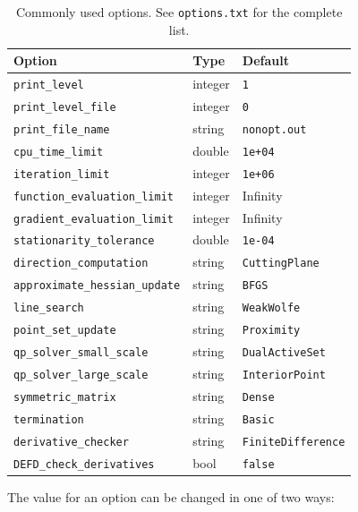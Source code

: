 \documentclass{article}
\begin{document}
\begin{table}[ht]
\centering
\begin{tabular}{|l|l|l|}
\hline
\textbf{Option} & \textbf{Type} & \textbf{Default} \\
\hline
\texttt{print\_level}                & integer & \texttt{1} \\
\texttt{print\_level\_file}          & integer & \texttt{0} \\
\texttt{print\_file\_name}           & string  & \texttt{nonopt.out} \\
\hline
\texttt{cpu\_time\_limit}            & double  & \texttt{1e+04} \\
\texttt{iteration\_limit}            & integer & \texttt{1e+06} \\
\texttt{function\_evaluation\_limit} & integer & Infinity \\
\texttt{gradient\_evaluation\_limit} & integer & Infinity \\
\texttt{stationarity\_tolerance}     & double  & \texttt{1e-04} \\
\hline
\texttt{direction\_computation}      & string  & \texttt{CuttingPlane} \\
\texttt{approximate\_hessian\_update}& string  & \texttt{BFGS} \\
\texttt{line\_search}                & string  & \texttt{WeakWolfe} \\
\texttt{point\_set\_update}          & string  & \texttt{Proximity} \\
\texttt{qp\_solver\_small\_scale}    & string  & \texttt{DualActiveSet} \\
\texttt{qp\_solver\_large\_scale}    & string  & \texttt{InteriorPoint} \\
\texttt{symmetric\_matrix}           & string  & \texttt{Dense} \\
\texttt{termination}                 & string  & \texttt{Basic} \\
\hline
\texttt{derivative\_checker}         & string  & \texttt{FiniteDifference} \\
\texttt{DEFD\_check\_derivatives}    & bool    & \texttt{false} \\
\hline
\end{tabular}
\caption{Commonly used options.  See \texttt{options.txt} for the complete list.}\label{tab.options}
\end{table}

The value for an option can be changed in one of two ways:
\end{document}

